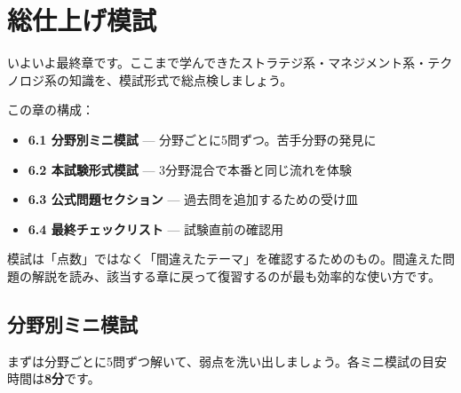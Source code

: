\chapter{総仕上げ模試}

いよいよ最終章です。ここまで学んできたストラテジ系・マネジメント系・テクノロジ系の知識を、模試形式で総点検しましょう。

\begin{keypoint}
この章の構成：
\begin{itemize}
  \item \textbf{6.1 分野別ミニ模試} — 分野ごとに5問ずつ。苦手分野の発見に
  \item \textbf{6.2 本試験形式模試} — 3分野混合で本番と同じ流れを体験
  \item \textbf{6.3 公式問題セクション} — 過去問を追加するための受け皿
  \item \textbf{6.4 最終チェックリスト} — 試験直前の確認用
\end{itemize}
\end{keypoint}

\begin{stumble}
模試は「点数」ではなく「間違えたテーマ」を確認するためのもの。間違えた問題の解説を読み、該当する章に戻って復習するのが最も効率的な使い方です。
\end{stumble}

\section{分野別ミニ模試}

まずは分野ごとに5問ずつ解いて、弱点を洗い出しましょう。各ミニ模試の目安時間は\textbf{8分}です。

